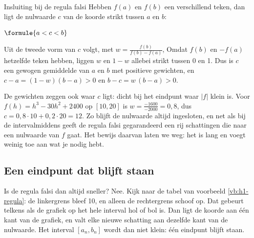 \begin{theorie}
\begin{stelling}{Insluiting bij de regula falsi}
Hebben $f(a)$ en $f(b)$ een verschillend teken, dan ligt de nulwaarde $c$ van de koorde strikt tussen $a$ en $b$:

\vspace{1mm}
\qquad $\formule{a < c < b}$
\end{stelling}

\begin{bewijs}
Uit de tweede vorm van $c$ volgt, met $w = \frac{f(b)}{f(b) - f(a)}$,
Omdat $f(b)$ en $-f(a)$ hetzelfde teken hebben, liggen $w$ en $1 - w$ allebei strikt tussen 0 en 1. Dus is $c$ een gewogen gemiddelde van $a$ en $b$ met positieve gewichten, en $c - a = (1 - w)(b - a) > 0$ en $b - c = w\,(b - a) > 0$.
\end{bewijs}
\end{theorie}

De gewichten zeggen ook waar $c$ ligt: dicht bij het eindpunt waar $|f|$ klein is. Voor $f(h) = h^3 - 30h^2 + 2400$ op $[10, 20]$ is $w = \frac{-1600}{-2000} = 0{,}8$, dus $c = 0{,}8 \cdot 10 + 0{,}2 \cdot 20 = 12$. Zo blijft de nulwaarde altijd ingesloten, en net als bij de intervalmiddens geeft de regula falsi gegarandeerd een rij schattingen die naar een nulwaarde van $f$ gaat. Het bewijs daarvan laten we weg: het is lang en voegt weinig toe aan wat je nodig hebt.

\begin{oefeningen}
\end{oefeningen}

\subsection{Een eindpunt dat blijft staan}

Is de regula falsi dan altijd sneller? Nee. Kijk naar de tabel van voorbeeld \ref{vb:h1-regula}: de linkergrens bleef 10, en alleen de rechtergrens schoof op. Dat gebeurt telkens als de grafiek op het hele interval hol of bol is. Dan ligt de koorde aan één kant van de grafiek, en valt elke nieuwe schatting aan dezelfde kant van de nulwaarde. Het interval $[a_n, b_n]$ wordt dan niet klein: één eindpunt blijft staan.

